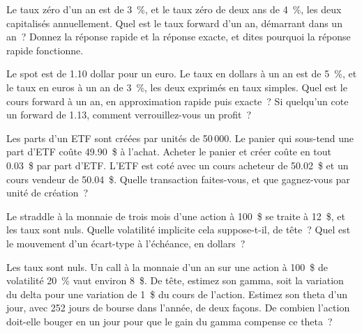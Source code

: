 \begin{question}\label{iq:iv2:options-and-bond-arithmetic-at-speed:9}
Le taux zéro d'un an est de 3~\%, et le taux zéro de deux ans de 4~\%, les deux capitalisés annuellement. Quel est le taux forward d'un an, démarrant dans un an~? Donnez la réponse rapide et la réponse exacte, et dites pourquoi la réponse rapide fonctionne.
\end{question}

\begin{question}\label{iq:iv2:options-and-bond-arithmetic-at-speed:10}
Le spot est de 1.10 dollar pour un euro. Le taux en dollars à un an est de 5~\%, et le taux en euros à un an de 3~\%, les deux exprimés en taux simples. Quel est le cours forward à un an, en approximation rapide puis exacte~? Si quelqu'un cote un forward de 1.13, comment verrouillez-vous un profit~?
\end{question}

\begin{question}\label{iq:iv2:options-and-bond-arithmetic-at-speed:11}
Les parts d'un ETF sont créées par unités de 50\,000. Le panier qui sous-tend une part d'ETF coûte 49.90~\$ à l'achat. Acheter le panier et créer coûte en tout 0.03~\$ par part d'ETF. L'ETF est coté avec un cours acheteur de 50.02~\$ et un cours vendeur de 50.04~\$. Quelle transaction faites-vous, et que gagnez-vous par unité de création~?
\end{question}

\begin{question}\label{iq:iv2:options-and-bond-arithmetic-at-speed:12}
Le straddle à la monnaie de trois mois d'une action à 100~\$ se traite à 12~\$, et les taux sont nuls. Quelle volatilité implicite cela suppose-t-il, de tête~? Quel est le mouvement d'un écart-type à l'échéance, en dollars~?
\end{question}

\begin{question}\label{iq:iv2:options-and-bond-arithmetic-at-speed:13}
Les taux sont nuls. Un call à la monnaie d'un an sur une action à 100~\$ de volatilité 20~\% vaut environ 8~\$. De tête, estimez son gamma, soit la variation du delta pour une variation de 1~\$ du cours de l'action. Estimez son theta d'un jour, avec 252 jours de bourse dans l'année, de deux façons. De combien l'action doit-elle bouger en un jour pour que le gain du gamma compense ce theta~?
\end{question}

